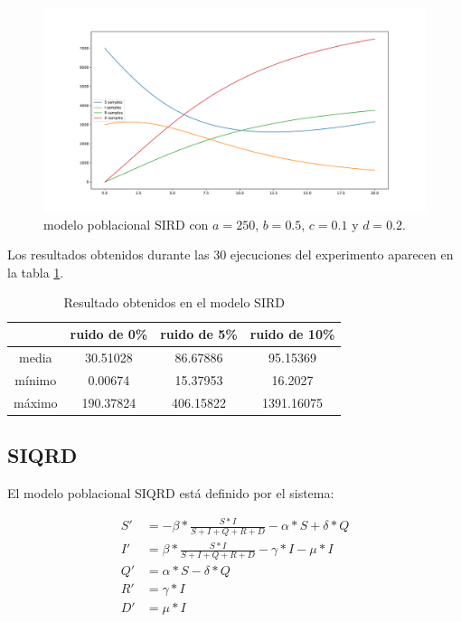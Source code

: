 \begin{figure}[h]
    \centering
    \includegraphics[width=\textwidth]{"figures/SIRD.pdf"}
    \caption{modelo poblacional SIRD con $a = 250$, $b = 0.5$, $c = 0.1$ y $d = 0.2$.}
    \label{fig:SIRD}
\end{figure}

Los resultados obtenidos durante las 30 ejecuciones del experimento aparecen en la tabla \ref{table:experiment_SIRD}.

\begin{table}[!h]
    \centering
    \caption{Resultado obtenidos en el modelo SIRD}
    \begin{tabular}{|c|c|c|c|}
        \hline
               & \textbf{ruido de 0\%} & \textbf{ruido de 5\%} & \textbf{ruido de 10\%} \\
        \hline
        media  & 30.51028              & 86.67886              & 95.15369               \\
        \hline
        mínimo & 0.00674               & 15.37953              & 16.2027                \\
        \hline
        máximo & 190.37824             & 406.15822             & 1391.16075             \\
        \hline
    \end{tabular}
    \label{table:experiment_SIRD}
\end{table}

\subsection{SIQRD}

El modelo poblacional SIQRD está definido por el sistema:

\begin{align*}
    S' & = -\beta * \frac{S * I}{S + I + Q + R + D} - \alpha * S + \delta * Q \\
    I' & = \beta * \frac{S * I}{S + I + Q + R + D} - \gamma * I - \mu * I     \\
    Q' & = \alpha * S - \delta * Q                                            \\
    R' & = \gamma * I                                                         \\
    D' & = \mu * I
\end{align*}

